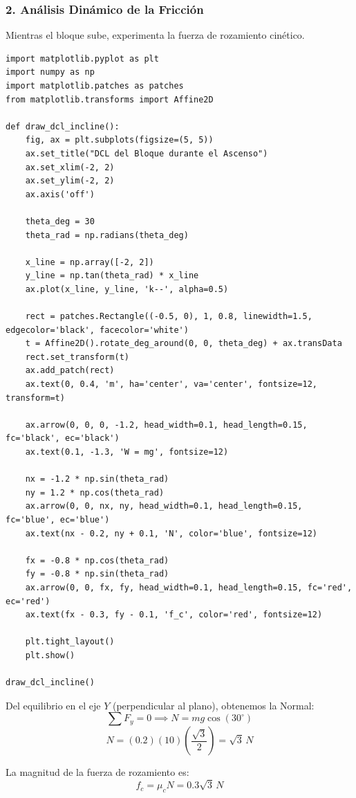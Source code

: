 \documentclass[12pt, a4paper]{article}
\begin{document}
\subsubsection*{2. Análisis Dinámico de la Fricción}
Mientras el bloque sube, experimenta la fuerza de rozamiento cinético. 

\begin{lstlisting}
import matplotlib.pyplot as plt
import numpy as np
import matplotlib.patches as patches
from matplotlib.transforms import Affine2D

def draw_dcl_incline():
    fig, ax = plt.subplots(figsize=(5, 5))
    ax.set_title("DCL del Bloque durante el Ascenso")
    ax.set_xlim(-2, 2)
    ax.set_ylim(-2, 2)
    ax.axis('off')

    theta_deg = 30
    theta_rad = np.radians(theta_deg)

    x_line = np.array([-2, 2])
    y_line = np.tan(theta_rad) * x_line
    ax.plot(x_line, y_line, 'k--', alpha=0.5)

    rect = patches.Rectangle((-0.5, 0), 1, 0.8, linewidth=1.5, edgecolor='black', facecolor='white')
    t = Affine2D().rotate_deg_around(0, 0, theta_deg) + ax.transData
    rect.set_transform(t)
    ax.add_patch(rect)
    ax.text(0, 0.4, 'm', ha='center', va='center', fontsize=12, transform=t)

    ax.arrow(0, 0, 0, -1.2, head_width=0.1, head_length=0.15, fc='black', ec='black')
    ax.text(0.1, -1.3, 'W = mg', fontsize=12)

    nx = -1.2 * np.sin(theta_rad)
    ny = 1.2 * np.cos(theta_rad)
    ax.arrow(0, 0, nx, ny, head_width=0.1, head_length=0.15, fc='blue', ec='blue')
    ax.text(nx - 0.2, ny + 0.1, 'N', color='blue', fontsize=12)

    fx = -0.8 * np.cos(theta_rad)
    fy = -0.8 * np.sin(theta_rad)
    ax.arrow(0, 0, fx, fy, head_width=0.1, head_length=0.15, fc='red', ec='red')
    ax.text(fx - 0.3, fy - 0.1, 'f_c', color='red', fontsize=12)

    plt.tight_layout()
    plt.show()

draw_dcl_incline()
\end{lstlisting}

Del equilibrio en el eje $Y$ (perpendicular al plano), obtenemos la Normal:
$$ \sum F_y = 0 \implies N = mg \cos(30^\circ) $$
$$ N = (0.2)(10)\left(\frac{\sqrt{3}}{2}\right) = \sqrt{3} \, \si{N} $$

La magnitud de la fuerza de rozamiento es:
$$ f_c = \mu_c N = 0.3 \sqrt{3} \, \si{N} $$
\end{document}
